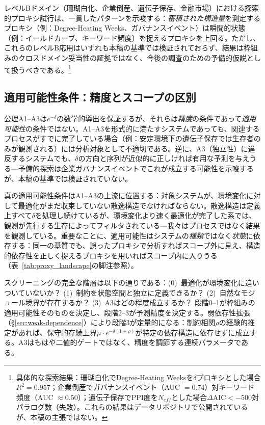 \documentclass[11pt,a4paper]{article}
\begin{document}
レベルBドメイン（珊瑚白化、企業倒産、遺伝子保存、金融市場）における探索的プロキシ試行は、一貫したパターンを示唆する：\emph{蓄積された構造量}を測定するプロキシ（例：Degree-Heating Weeks、ガバナンスイベント）は瞬間的状態（例：イールドカーブ、キーワード頻度）を捉えるプロキシを上回る。ただし、これらのレベルB応用はいずれも本稿の基準では検証されておらず、結果は枠組みのクロスドメイン妥当性の証拠ではなく、今後の調査のための予備的仮説として扱うべきである。\footnote{具体的な探索結果：珊瑚白化でDegree-Heating Weeksを$\delta$プロキシとした場合$R^2 = 0.957$；企業倒産でガバナンスイベント（AUC $= 0.74$）対キーワード頻度（AUC $\approx 0.50$）；遺伝子保存でPPI度を$N_{eff}$とした場合$\Delta\text{AIC} < -500$対パラログ数（失敗）。これらの結果はデータリポジトリで公開されているが、本稿の主張ではない。}

\subsection{適用可能性条件：精度とスコープの区別}

公理A1--A3は$e^{-\delta}$の数学的導出を保証するが、それらは\emph{精度}の条件であって\emph{適用可能性}の条件ではない。A1--A3を形式的に満たすシステムであっても、関連するプロセスがすでに完了している場合（例：安定環境下の遺伝子保存では生存者のみが観測される）には分析対象として不適切である。逆に、A3（独立性）に違反するシステムでも、$\delta$の方向と序列が近似的に正しければ有用な予測を与えうる---予備的探索は企業ガバナンスイベントでこれが成立する可能性を示唆するが、本稿の基準では検証されていない。

真の適用可能性条件はA1--A3の上流に位置する：対象システムが、環境変化に対して最適化がまだ収束していない散逸構造でなければならない。散逸構造は定義上すべて$\delta$を処理し続けているが、環境変化より速く最適化が完了した系では、観測が先行する生存によってフィルタされている---我々はプロセスではなく結果を観測している。重要なことに、適用可能性はシステムの\emph{種類}ではなく\emph{状態}に依存する：同一の基質でも、誤ったプロキシで分析すればスコープ外に見え、構造的依存性を正しく捉えるプロキシを用いればスコープ内に入りうる（表~\ref{tab:proxy_landscape}の脚注参照）。

スクリーニングの完全な階層は以下の通りである：(0)~最適化が環境変化に追いついていないか？ (1)~制約を状態空間と独立に定義できるか？ (2)~自然なモジュール境界が存在するか？ (3)~A3はどの程度成立するか？ 段階0--1が枠組みの適用可能性そのものを決定し、段階2--3が予測精度を決定する。弱依存性拡張（\S\ref{sec:weak-dependence}）により段階3が定量的になる：制約相関$\rho$の経験的推定があれば、保守的存続上界$\mu \cdot e^{-\delta(1+\rho)}$が特定の依存構造に依存せずに成立する。A3はもはや二値的ゲートではなく、精度を調節する連続パラメータである。
\end{document}
